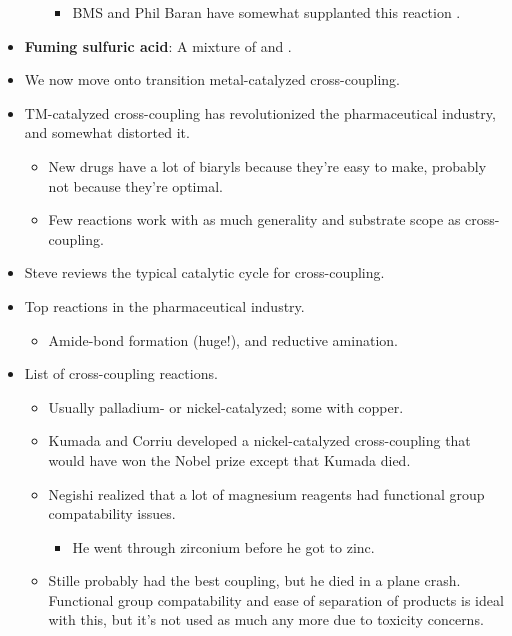 \documentclass[../notes.tex]{subfiles}
\begin{document}
\begin{itemize}
\begin{itemize}
        \begin{itemize}
            \item BMS and Phil Baran have somewhat supplanted this reaction \parencite{bib:PyNOCl}.
        \end{itemize}
    \end{itemize}
    \item \textbf{Fuming sulfuric acid}: A mixture of  and .
    \item We now move onto transition metal-catalyzed cross-coupling.
    \item TM-catalyzed cross-coupling has revolutionized the pharmaceutical industry, and somewhat distorted it.
    \begin{itemize}
        \item New drugs have a lot of biaryls because they're easy to make, probably not because they're optimal.
        \item Few reactions work with as much generality and substrate scope as cross-coupling.
    \end{itemize}
    \item Steve reviews the typical catalytic cycle for cross-coupling.
    \item Top reactions in the pharmaceutical industry.
    \begin{itemize}
        \item Amide-bond formation (huge!), and reductive amination.
    \end{itemize}
    \item List of cross-coupling reactions.
    \begin{itemize}
        \item Usually palladium- or nickel-catalyzed; some with copper.
        \item Kumada and Corriu developed a nickel-catalyzed cross-coupling that would have won the Nobel prize except that Kumada died.
        \item Negishi realized that a lot of magnesium reagents had functional group compatability issues.
        \begin{itemize}
            \item He went through zirconium before he got to zinc.
        \end{itemize}
        \item Stille probably had the best coupling, but he died in a plane crash. Functional group compatability and ease of separation of products is ideal with this, but it's not used as much any more due to toxicity concerns.

\end{itemize}
\end{itemize}
\end{document}

